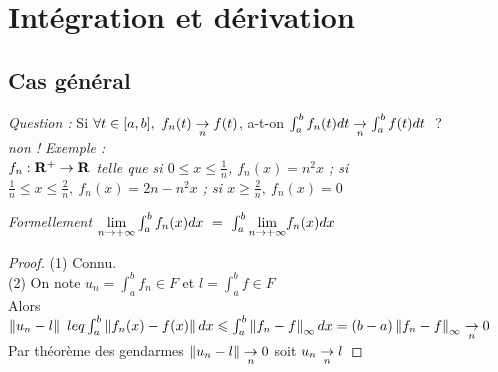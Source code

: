 \section{Intégration et dérivation}
    \subsection{Cas général}

        \emph{Question :} Si $\forall t\in [a,b] ,~f_n(t) \underset{n}{\rightarrow} f(t)$, a-t-on $\int_a^b f_n(t) dt \underset{n}{\rightarrow} \int_a^b f(t) dt~$ ?\\
        \emph{\emph{non !}} \textit{\small Exemple : \\ 
        $f_n : {\mathbf{R}}^+ \rightarrow {\mathbf{R}}$ telle que si $0\leqslant x\leqslant \frac{1}{n}$, $f_n(x) = n^2x$ ; 
        si $\frac{1}{n} \leqslant x \leqslant \frac{2}{n},~f_n(x) = 2n-n^2x$ ; si $x\geqslant \frac{2}{n} ,~f_n(x) = 0$} \\

         \medskip

        \textit{\small Formellement ${\underset{n \rightarrow +\infty}{\lim}} \int_a^b f_n(x) dx ~=~ \int_a^b {\underset{n \rightarrow +\infty}{\lim}} f_n(x) dx$} \\
        
        \begin{proof}
        {\tiny (1)} Connu.\\
        {\tiny (2)} On note $u_n = \int_a^b f_n \in F$ et $l= \int_a^b f \in F$ \\
        Alors $\left\Vert u_n-l \right\Vert \ leq \int_a^b \left\Vert f_n(x) - f(x)  \right\Vert dx \leqslant \int_a^b \left\Vert f_n-f \right\Vert_{\infty} dx = (b-a) \left\Vert f_n-f \right\Vert_{\infty} 
        \underset{n}{\rightarrow} 0$ \\Par théorème des gendarmes $\left\Vert u_n-l \right\Vert \underset{n}{\rightarrow} 0$ soit $u_n \underset{n}{\rightarrow} l$
        \end{proof} \medskip

         \medskip


